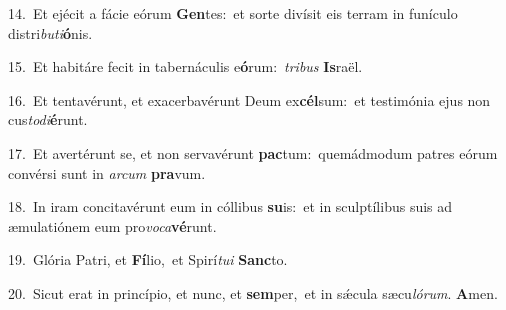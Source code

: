{\numbfont\textcolor{\numbcolor}{14.}}~Et ejécit a fácie eórum \textbf{Gen}\-tes:~\star et sorte divísit eis terram in funículo distri\-\textit{bu}\-\textit{ti}\textbf{ó}nis.\par
{\numbfont\textcolor{\numbcolor}{15.}}~Et habitáre fecit in tabernáculis e\-\textbf{ó}\-rum:~\star \textit{tri}\-\textit{bus} \textbf{Is}\-raël.\par
{\numbfont\textcolor{\numbcolor}{16.}}~Et tentavérunt, et exacerbavérunt Deum ex\-\textbf{cél}\-sum:~\star et testimónia ejus non cus\-\textit{to}\-\textit{di}\textbf{é}runt.\par
{\numbfont\textcolor{\numbcolor}{17.}}~Et avertérunt se, et non servavérunt \textbf{pac}\-tum:~\star quemádmodum patres eórum convérsi sunt in \textit{ar}\-\textit{cum} \textbf{pra}\-vum.\par
{\numbfont\textcolor{\numbcolor}{18.}}~In iram concitavérunt eum in cóllibus \textbf{su}\-is:~\star et in sculptílibus suis ad æmulatiónem eum pro\-\textit{vo}\-\textit{ca}\textbf{vé}runt.\par
{\numbfont\textcolor{\numbcolor}{19.}}~Glória Patri, et \textbf{Fí}\-lio,~\star et Spirí\-\textit{tu}\-\textit{i} \textbf{Sanc}\-to.\par
{\numbfont\textcolor{\numbcolor}{20.}}~Sicut erat in princípio, et nunc, et \textbf{sem}\-per,~\star et in sǽcula sæcu\-\textit{ló}\-\textit{rum}. \textbf{A}\-men.\par
